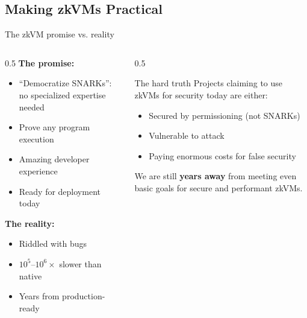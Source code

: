 \ifdefined\PRESENTATION\else\PassOptionsToClass{handout}{beamer}\fi\documentclass[aspectratio=169, lualatex]{beamer}
\begin{document}
\subsection{Making zkVMs Practical}

\begin{frame}{The zkVM promise vs. reality}
	\begin{columns}[c]
		\begin{column}{0.5\textwidth}
			\textbf{The promise:}
			\begin{itemize}
				\item ``Democratize SNARKs'': no specialized expertise needed
				\item Prove any program execution
				\item Amazing developer experience
				\item Ready for deployment today
			\end{itemize}
			\textbf{The reality:}
			\begin{itemize}
				\item Riddled with bugs
				\item $10^5$--$10^6\times$ slower than native
				\item Years from production-ready
			\end{itemize}
		\end{column}
		\begin{column}{0.5\textwidth}
			\begin{alertblock}{The hard truth}
				Projects claiming to use zkVMs for security today are either:
				\begin{itemize}
					\item Secured by permissioning (not SNARKs)
					\item Vulnerable to attack
					\item Paying enormous costs for false security
				\end{itemize}
			\end{alertblock}
			We are still \textbf{years away} from meeting even basic goals for secure and performant zkVMs.
		\end{column}
	\end{columns}
\end{frame}
\end{document}
